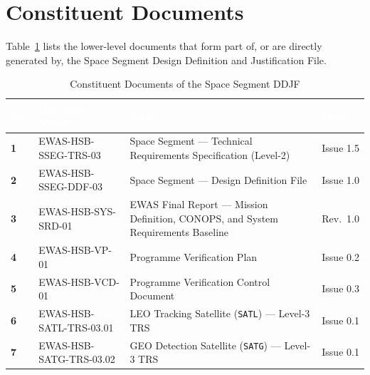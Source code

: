 \section{Constituent Documents}
\label{sec:constituent_docs}

Table~\ref{tab:constituent_docs} lists the lower-level documents that form part of, or are directly generated by, the Space Segment Design Definition and Justification File.

\begin{table}[H]
\centering
\small
\renewcommand{\arraystretch}{1.25}
\begin{tabularx}{\textwidth}{|>{\centering\arraybackslash\hsize=0.25\hsize}X|>{\raggedright\arraybackslash\hsize=1.05\hsize}X|>{\raggedright\arraybackslash\hsize=2.20\hsize}X|>{\centering\arraybackslash\hsize=0.50\hsize}X|}
    \hline
    \rowcolor{TableHeaderBlue}
    \textcolor{white}{\textbf{No.}} & 
    \textcolor{white}{\textbf{Document Number}} & 
    \textcolor{white}{\textbf{Title}} & 
    \textcolor{white}{\textbf{Issue}} \\ \hline
    \textbf{1} & EWAS-HSB-SSEG-TRS-03    & Space Segment --- Technical Requirements Specification (Level-2)                   & Issue 1.5 \\ \hline
    \textbf{2} & EWAS-HSB-SSEG-DDF-03    & Space Segment --- Design Definition File                                           & Issue 1.0 \\ \hline
    \textbf{3} & EWAS-HSB-SYS-SRD-01     & EWAS Final Report --- Mission Definition, CONOPS, and System Requirements Baseline & Rev.\ 1.0 \\ \hline
    \textbf{4} & EWAS-HSB-VP-01          & Programme Verification Plan                                                        & Issue 0.2 \\ \hline
    \textbf{5} & EWAS-HSB-VCD-01         & Programme Verification Control Document                                            & Issue 0.3 \\ \hline
    \textbf{6} & EWAS-HSB-SATL-TRS-03.01 & LEO Tracking Satellite (\texttt{SATL}) --- Level-3 TRS                            & Issue 0.1 \\ \hline
    \textbf{7} & EWAS-HSB-SATG-TRS-03.02 & GEO Detection Satellite (\texttt{SATG}) --- Level-3 TRS                           & Issue 0.1 \\ \hline
\end{tabularx}
\caption{Constituent Documents of the Space Segment DDJF}
\label{tab:constituent_docs}
\end{table}
